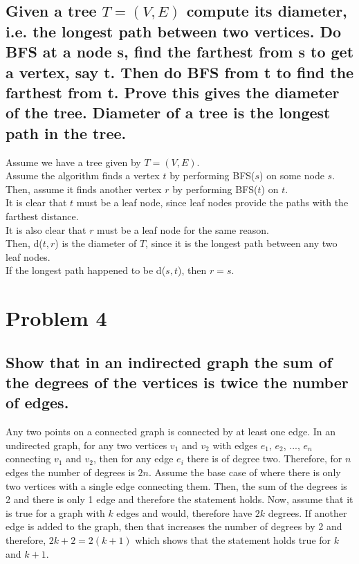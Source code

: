 \documentclass{article}
\begin{document}
	\subsection*{Given a tree $T=(V,E)$ compute its diameter, i.e. the longest path between two vertices. Do BFS at a node s, find the farthest from s to get a vertex, say t. Then do BFS from t to find  the farthest from t.   Prove this gives the diameter of the tree. Diameter of a tree is the longest path in the tree.}
    Assume we have a tree given by $T=(V,E)$.\\
    Assume the algorithm finds a vertex $t$ by performing BFS($s$) on some node $s$.\\
    Then, assume it finds another vertex $r$ by performing BFS($t$) on $t$.\\
    It is clear that $t$ must be a leaf node, since leaf nodes provide the paths with the farthest distance.\\
    It is also clear that $r$ must be a leaf node for the same reason.\\
    Then, d($t,r$) is the diameter of $T$, since it is the longest path between any two leaf nodes.\\
    If the longest path happened to be d($s,t$), then $r=s$.
    

		
\section*{Problem 4}
	\subsection*{Show that in an indirected graph the sum of the degrees of the vertices is twice the number of edges.}
	Any two points on a connected graph is connected by at least one edge. In an undirected graph, for any two vertices $v_1$ and $v_2$ with edges $e_1$, $e_2$, ..., $e_n$ connecting $v_1$ and $v_2$, then for any edge $e_i$ there is of degree two. Therefore, for $n$ edges the number of degrees is $2n$. Assume the base case of where there is only two vertices with a single edge connecting them. Then, the sum of the degrees is 2 and there is only 1 edge and therefore the statement holds. Now, assume that it is true for a graph with $k$ edges and would, therefore have $2k$ degrees. If another edge is added to the graph, then that increases the number of degrees by 2 and therefore, $2k+2 = 2(k+1)$ which shows that the statement holds true for $k$ and $k+1$.
\end{document}
